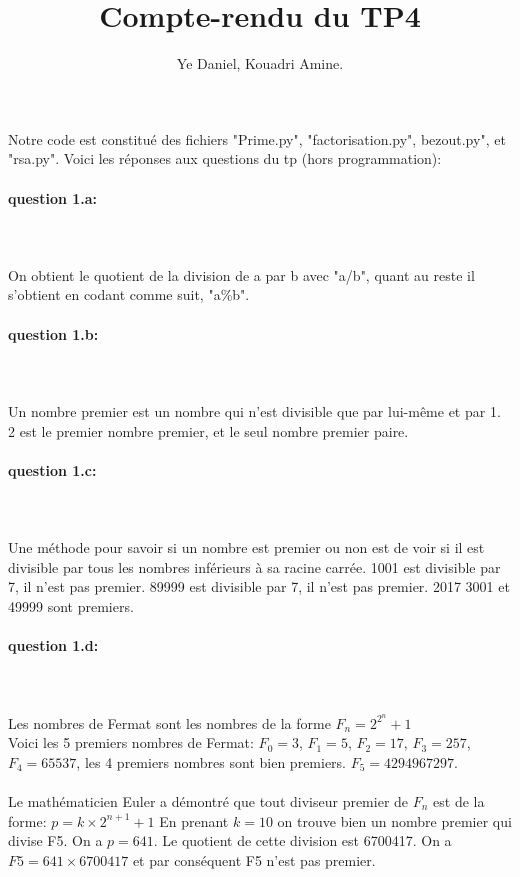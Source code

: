 \documentclass{article}
\author{Ye Daniel, Kouadri Amine.}
\title{Compte-rendu du TP4}
\begin{document}
\maketitle Notre code est constitué des fichiers "Prime.py", "factorisation.py", bezout.py", et "rsa.py".
Voici les réponses aux questions du tp (hors programmation):
\paragraph{question 1.a:}
~~\\
\\ 
On obtient le quotient de la division de a par b avec "a/b", quant au reste il s'obtient en codant comme suit, "a\%b".
\paragraph{question 1.b:}
~~\\
\\ 
Un nombre premier est un nombre qui n'est divisible que par lui-même et par 1. 2 est le premier nombre premier, et le seul nombre premier paire.
\paragraph{question 1.c:}
~~\\
\\ 
Une méthode pour savoir si un nombre est premier ou non est de voir si il est divisible par tous les nombres inférieurs à sa racine carrée.
1001 est divisible par 7, il n'est pas premier.
89999 est divisible par 7, il n'est pas premier.
2017 3001 et 49999 sont premiers.
\paragraph{question 1.d:}
~~\\
\\ 
Les nombres de Fermat sont les nombres de la forme $F_n=2^{2^{n}}+1$
\\
Voici les 5 premiers nombres de Fermat:
$F_0=3$,
$F_1=5$,
$F_2=17$,
$F_3=257$,
$F_4=65537$,
les 4 premiers nombres sont bien premiers.
$F_5=4294967297$.
\\
\\
Le mathématicien Euler a démontré que tout diviseur premier de $F_n$ est de la forme:
$p=k\times2^{n+1}+1$
En prenant $k=10$ on trouve bien un nombre premier qui divise F5. On a $p=641$.
Le quotient de cette division est 6700417. On a $F5=641\times6700417$ et par conséquent F5 n'est pas premier.
\end{document}
